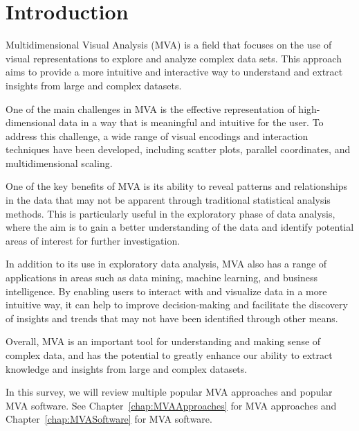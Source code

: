 %
%
% 
% 
% 


\chapter{Introduction}

\label{chap:Intro}



Multidimensional Visual Analysis (MVA) is a field that focuses on the use of visual representations to explore and analyze complex data sets. This approach aims to provide a more intuitive and interactive way to understand and extract insights from large and complex datasets.

One of the main challenges in MVA is the effective representation of high-dimensional data in a way that is meaningful and intuitive for the user. To address this challenge, a wide range of visual encodings and interaction techniques have been developed, including scatter plots, parallel coordinates, and multidimensional scaling.

One of the key benefits of MVA is its ability to reveal patterns and relationships in the data that may not be apparent through traditional statistical analysis methods. This is particularly useful in the exploratory phase of data analysis, where the aim is to gain a better understanding of the data and identify potential areas of interest for further investigation.

In addition to its use in exploratory data analysis, MVA also has a range of applications in areas such as data mining, machine learning, and business intelligence. By enabling users to interact with and visualize data in a more intuitive way, it can help to improve decision-making and facilitate the discovery of insights and trends that may not have been identified through other means.

Overall, MVA is an important tool for understanding and making sense of complex data, and has the potential to greatly enhance our ability to extract knowledge and insights from large and complex datasets.

In this survey, we will review multiple popular MVA approaches and popular MVA software. See Chapter~\ref{chap:MVAApproaches} for MVA approaches and Chapter~\ref{chap:MVASoftware} for MVA software. 